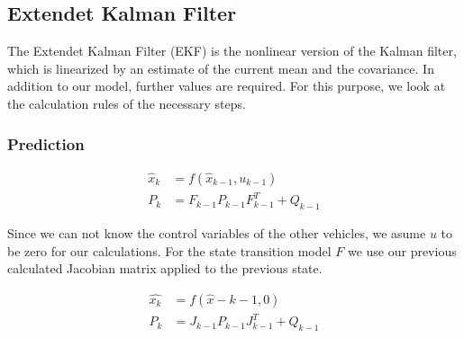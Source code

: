 \documentclass[11pt,oneside,openright]{mpreport}
\begin{document}
\subsection{Extendet Kalman Filter}



The Extendet Kalman Filter (EKF)  is the nonlinear version of the Kalman filter, which is linearized by an estimate of the current mean and the covariance.
In addition to our model, further values are required. For this purpose, we look at the calculation rules of the necessary steps.

\subsubsection{Prediction}

\begin{align*}
\hat{x}_{k} &= f(\hat{x}_{k-1},u_{k-1})\\
P_{k}&=F_{k-1} P_{k-1} {F^T_{k-1}} + Q_{k-1}
\end{align*}


Since we can not know the control variables of the other vehicles, we asume $u$ to be zero for our calculations.
For the state transition model $F$ we use our previous calculated Jacobian matrix applied to the previous state.

\begin{align*}
\hat{x_{k}} &= f(\hat{x}-{k-1},0)\\
P_{k}&=J_{k-1} P_{k-1} {J^T_{k-1}} + Q_{k-1}
\end{align*}

\end{document}
